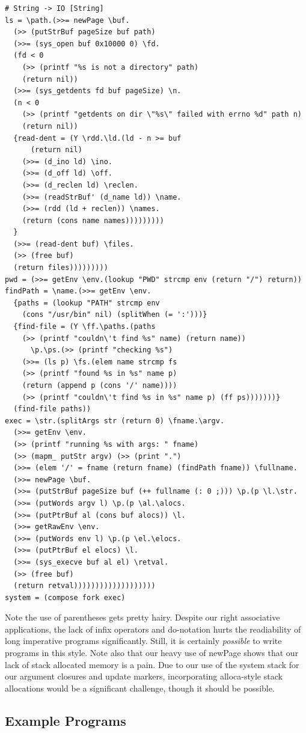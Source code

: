 \begin{verbatim}
# String -> IO [String]
ls = \path.(>>= newPage \buf.
  (>> (putStrBuf pageSize buf path) 
  (>>= (sys_open buf 0x10000 0) \fd.
  (fd < 0 
    (>> (printf "%s is not a directory" path)
    (return nil))
  (>>= (sys_getdents fd buf pageSize) \n.
  (n < 0 
    (>> (printf "getdents on dir \"%s\" failed with errno %d" path n)
    (return nil))
  {read-dent = (Y \rdd.\ld.(ld - n >= buf
      (return nil)
    (>>= (d_ino ld) \ino.
    (>>= (d_off ld) \off.
    (>>= (d_reclen ld) \reclen.
    (>>= (readStrBuf' (d_name ld)) \name.
    (>>= (rdd (ld + reclen)) \names.
    (return (cons name names)))))))))
  }
  (>>= (read-dent buf) \files.
  (>> (free buf)
  (return files)))))))))
pwd = (>>= getEnv \env.(lookup "PWD" strcmp env (return "/") return))
findPath = \name.(>>= getEnv \env.
  {paths = (lookup "PATH" strcmp env 
    (cons "/usr/bin" nil) (splitWhen (= ':')))}
  {find-file = (Y \ff.\paths.(paths 
    (>> (printf "couldn\'t find %s" name) (return name)) 
      \p.\ps.(>> (printf "checking %s")
    (>>= (ls p) \fs.(elem name strcmp fs 
    (>> (printf "found %s in %s" name p) 
    (return (append p (cons '/' name)))) 
    (>> (printf "couldn\'t find %s in %s" name p) (ff ps)))))))}
  (find-file paths))
exec = \str.(splitArgs str (return 0) \fname.\argv.
  (>>= getEnv \env.
  (>> (printf "running %s with args: " fname)
  (>> (mapm_ putStr argv) (>> (print ".")
  (>>= (elem '/' = fname (return fname) (findPath fname)) \fullname.
  (>>= newPage \buf.
  (>>= (putStrBuf pageSize buf (++ fullname (: 0 ;))) \p.(p \l.\str.
  (>>= (putWords argv l) \p.(p \al.\alocs.
  (>>= (putPtrBuf al (cons buf alocs)) \l.
  (>>= getRawEnv \env.
  (>>= (putWords env l) \p.(p \el.\elocs.
  (>>= (putPtrBuf el elocs) \l.
  (>>= (sys_execve buf al el) \retval.
  (>> (free buf)
  (return retval)))))))))))))))))))
system = (compose fork exec)
\end{verbatim}

Note the use of parentheses gets pretty hairy. Despite our right associative
applications, the lack of infix operators and do-notation hurts the readiability
of long imperative programs significantly. Still, it is certainly
\emph{possible} to write programs in this style. Note also that our heavy use of
newPage shows that our lack of stack allocated memory is a pain. Due to our use
of the system stack for our argument closures and update markers, incorporating
alloca-style stack allocations would be a significant challenge, though it
should be possible. 

\subsection{Example Programs}

